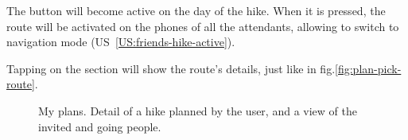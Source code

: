 The  button will become active on the day of the hike.
When it is pressed, the route will be activated on the phones of all the attendants, allowing to switch to navigation mode (US~\ref{US:friends-hike-active}).

Tapping on the  section will show the route's details, just like in fig.\ref{fig:plan-pick-route}.

\begin{figure}[h!]
    \centering
    \hfill
    \hfill
    \hfill
    \caption{My plans. Detail of a hike planned by the user, and a view of the invited and going people.}
    \label{fig:plan-my-plans}
\end{figure}

